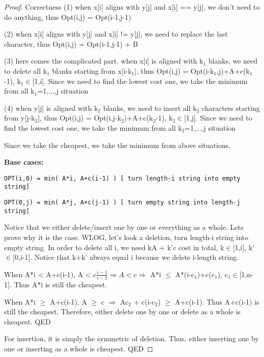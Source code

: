 \documentclass[openany]{article}
\begin{document}
\begin{proof}{Correctness}
    (1) when x[i] aligns with y[j] and x[i] == y[j], we don't need to do anything, thus Opt(i,j) = Opt(i-1,j-1)
    
    (2) when x[i] aligns with y[j] and x[i] != y[j], we need to replace the last character, thus Opt(i,j) = Opt(i-1,j-1) + B
    
    (3) here comes the complicated part. when x[i] is aligned with k$_1$ blanks, we need to delete all k$_1$ blanks starting from x[i-k$_1$], thus Opt(i,j) = Opt(i-k$_1$,j)+A+c(k$_1$-1), k$_1\in$[1,i]. Since we need to find the lowest cost one, we take the minimum from all k$_1$=1,...,j situation
    
    (4) when y[j] is aligned with k$_2$ blanks, we need to insert all k$_2$ characters starting from y[j-k$_2$], thus Opt(i,j) = Opt(i,j-k$_2$)+A+c(k$_2$-1), k$_2\in$[1,j]. Since we need to find the lowest cost one, we take the minimum from all k$_2$=1,...,j situation
    
    Since we take the cheapest, we take the minimum from above situations.
    
   \textbf{Base cases:}
   \begin{center}
        \texttt{OPT(i,0) = min( A*i, A+c(i-1) ) [ turn length-i string into empty string]}
        
        \texttt{OPT(0,j) = min( A*j, A+c(j-1) ) [ turn empty string into length-j string]}
        
   \end{center}
   
        Notice that we either delete/insert one by one or everything as a whole. Lets prove why it is the case. WLOG, let's look a deletion, turn length-i string into empty string. In order to delete all i, we need kA + k'c cost in total, k$\in$[1,i], k'$\in$[0,i-1]. Notice that k+k' always equal i because we delete i-length string. 
        
        When A*i < A+c(i-1), A < c$\frac{i-1}{i-1} \Rightarrow A < c \Rightarrow$ A*i $\leq$ A*(i-c$_1$)+c(c$_1$), c$_1 \in$[1,n-1]. Thus A*i is still the cheapest.
        
        When A*i $\geq$ A+c(i-1), A $\geq$ c $\Rightarrow$ Ac$_2$ + c(i-c$_2$) $\geq$ A+c(i-1). Thus A+c(i-1) is still the cheapest. Therefore, either delete one by one or delete as a whole is cheapest. QED
        
        For insertion, it is simply the symmetric of deletion. Thus, either inserting one by one or inserting as a whole is cheapest. QED


\end{proof}
\end{document}
